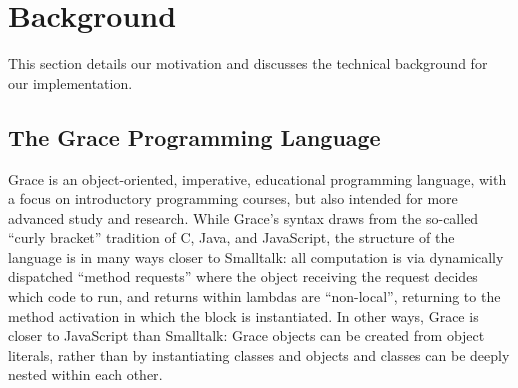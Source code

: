 
\section{Background}
\label{sec:background}

This section details our motivation and
discusses the technical background for our implementation.


%
%

\subsection{The Grace Programming Language}
\label{ssec:grace}



Grace is an object-oriented, imperative, educational programming
language, with a focus on introductory programming
courses, but also intended for more advanced study and research\citep{graceOnward12,graceSigcse13}.
%
While Grace's syntax draws
from the so-called ``curly bracket'' tradition of C, Java, and
JavaScript, the structure of the language
is in many ways closer to Smalltalk:
all computation is via dynamically dispatched  ``method requests''
where the object receiving the request decides which code to run,
and
%
returns within lambdas are ``non-local'', returning to the method
activation in which the block is instantiated\citep{bluebook}.  In
other ways, Grace is closer to JavaScript than Smalltalk: Grace
objects can be created from object literals, rather than by
instantiating classes\citep{Black2007-emeraldHOPL,JonesECOOP2016} and
objects and classes can be deeply nested within each 
other\citep{betabook}.

